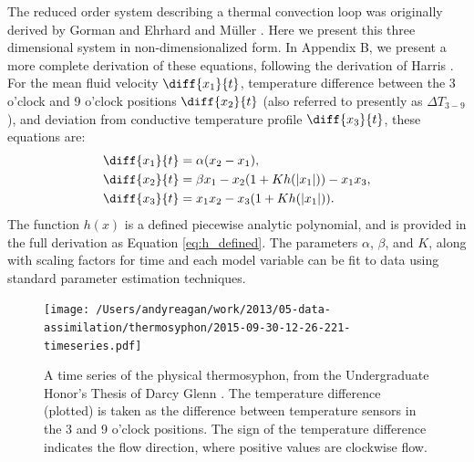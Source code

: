 The reduced order system describing a thermal convection loop was originally derived by Gorman \cite{gorman1986} and Ehrhard and M\"{u}ller \cite{ehrhard1990dynamical}.
Here we present this three dimensional system in non-dimensionalized form.
In Appendix B, we present a more complete derivation of these equations, following the derivation of Harris \cite{harris2011predicting}.
For the mean fluid velocity $\diff{x_1}{t}$, temperature difference between the 3 o'clock and 9 o'clock positions $\diff{x_2}{t}$ (also referred to presently as $\Delta T_{3-9}$), and deviation from conductive temperature profile $\diff{x_3}{t}$, these equations are:
\begin{align}
& \diff{x_1}{t} = \alpha (x_2 - x_1),\\
& \diff{x_2}{t} = \beta x_1 - x_2 (1 + Kh(|x_1|)) - x_1x_3,\\
  & \diff{x_3}{t} = x_1x_2 - x_3 (1 + Kh(|x_1|)) .\end{align}
The function $h(x)$ is a defined piecewise analytic polynomial, and is provided in the full derivation as Equation \ref{eq:h_defined}.
The parameters $\alpha$, $\beta$, and $K$, along with scaling factors for time and each model variable can be fit to data using standard parameter estimation techniques.

\begin{figure}[h!]
  \centering
  \texttt{[image: /Users/andyreagan/work/2013/05-data-assimilation/thermosyphon/2015-09-30-12-26-221-timeseries.pdf]}
  \caption[A time series of the physical thermosyphon, from the Undergraduate Honor's Thesis of Darcy Glenn {\protect \cite{glenn2013}}]{
    A time series of the physical thermosyphon, from the Undergraduate Honor's Thesis of Darcy Glenn {\protect \cite{glenn2013}}.
    The temperature difference (plotted) is taken as the difference between temperature sensors in the 3 and 9 o'clock positions.
    The sign of the temperature difference indicates the flow direction, where positive values are clockwise flow.
  }
  \label{fig:thermosyphon-physical-timeseries}
\end{figure}


